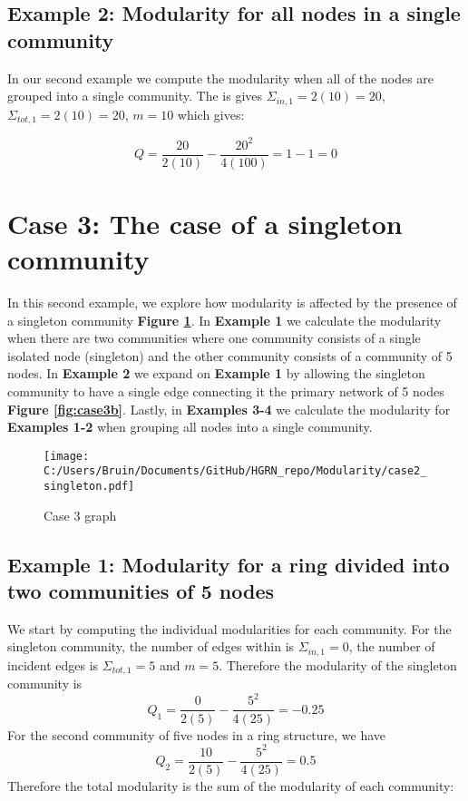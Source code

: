 \documentclass[a4paper,12pt]{article}
\begin{document}
	\subsection*{Example 2: Modularity for all nodes in a single community}
		In our second example we compute the modularity when all of the nodes are grouped into a single community. The is gives $\Sigma_{in,1} = 2(10) = 20$, $\Sigma_{tot,1} = 2(10) = 20$,  $m = 10$ which gives:
	
		\[ Q = \frac{20}{2(10)}-\frac{20^2}{4(100)} = 1-1 = 0 \]
	
	
	
	
	
	
	
	
	
	
	
	
	
	
	
	
	
	
	
	
	
	

	\section{Case 3: The case of a singleton community}
	In this second example, we explore how modularity is affected by the presence of a singleton community \textbf{Figure \ref{fig:case3}}. In \textbf{Example 1} we calculate the modularity when there are two communities where one community consists of a single isolated node (singleton) and the other community consists of a community of 5 nodes. In \textbf{Example 2} we expand on \textbf{Example 1} by allowing the singleton community to have a single edge connecting it the primary network of 5 nodes \textbf{Figure \ref{fig:case3b}}. Lastly, in \textbf{Examples 3-4} we calculate the modularity for \textbf{Examples 1-2} when grouping all nodes into a single community. 
	
	\begin{figure}[H]
		\centering
		\caption{Case 3 graph}
		\texttt{[image: C:/Users/Bruin/Documents/GitHub/HGRN\_repo/Modularity/case2\_singleton.pdf]}
		\label{fig:case3}
	\end{figure}
	
	\subsection*{Example 1: Modularity for a ring divided into two communities of 5 nodes}
	We start by computing the individual modularities for each community. For the singleton community, the number of edges within is $\Sigma_{in,1} = 0$, the number of incident edges is $\Sigma_{tot,1} = 5$ and $m = 5$. Therefore the modularity of the singleton community is 
	\[Q_1 = \frac{0}{2(5)} - \frac{5^2}{4(25)} = -0.25\]
	For the second community of five nodes in a ring structure, we have 
	\[Q_2 = \frac{10}{2(5)} - \frac{5^2}{4(25)} = 0.5\]
	Therefore the total modularity is the sum of the modularity of each community:
	
\end{document}
